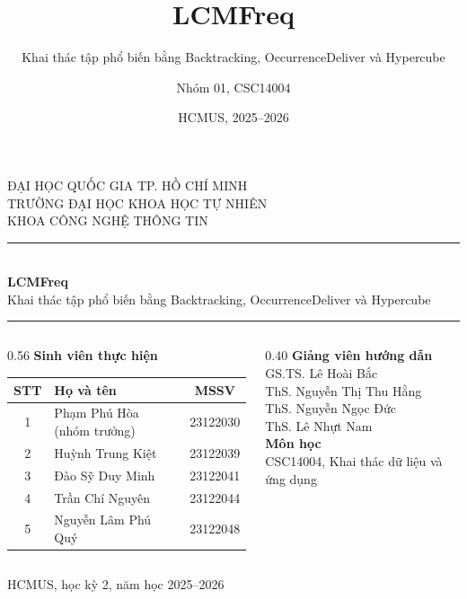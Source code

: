 \documentclass[9pt, aspectratio=169]{beamer}
\title{LCMFreq}
\subtitle{Khai thác tập phổ biến bằng Backtracking, OccurrenceDeliver và Hypercube}
\author{Nhóm 01, CSC14004}
\date{HCMUS, 2025--2026}
\begin{document}
\begin{frame}[plain]
  \begin{center}
    {\small ĐẠI HỌC QUỐC GIA TP. HỒ CHÍ MINH}\\
    {\small TRƯỜNG ĐẠI HỌC KHOA HỌC TỰ NHIÊN}\\
    {\small KHOA CÔNG NGHỆ THÔNG TIN}\\[0.35cm]
    {\color{psdearblue}\rule{0.62\linewidth}{0.6pt}}\\[0.3cm]
    {\Large\bfseries\color{psdearnavy} LCMFreq}\\[0.18cm]
    {\large Khai thác tập phổ biến bằng Backtracking, OccurrenceDeliver và Hypercube}\\[0.3cm]
    {\color{psdearblue}\rule{0.62\linewidth}{0.6pt}}
  \end{center}

  \vspace{0.35cm}
  \begin{columns}[T,onlytextwidth]
    \begin{column}{0.56\textwidth}
      \small
      \textbf{Sinh viên thực hiện}
      \vspace{0.1cm}

      \begin{tabular}{@{}c l c@{}}
        \toprule
        STT & Họ và tên & MSSV \\
        \midrule
        1 & Phạm Phú Hòa (nhóm trưởng) & 23122030 \\
        2 & Huỳnh Trung Kiệt & 23122039 \\
        3 & Đào Sỹ Duy Minh & 23122041 \\
        4 & Trần Chí Nguyên & 23122044 \\
        5 & Nguyễn Lâm Phú Quý & 23122048 \\
        \bottomrule
      \end{tabular}
    \end{column}
    \begin{column}{0.40\textwidth}
      \small
      \textbf{Giảng viên hướng dẫn}\\[0.1cm]
      GS.TS. Lê Hoài Bắc\\
      ThS. Nguyễn Thị Thu Hằng\\
      ThS. Nguyễn Ngọc Đức\\
      ThS. Lê Nhựt Nam\\[0.3cm]
      \textbf{Môn học}\\
      CSC14004, Khai thác dữ liệu và ứng dụng
    \end{column}
  \end{columns}

  \vfill
  {\scriptsize\color{psdeargray}HCMUS, học kỳ 2, năm học 2025--2026}
\end{frame}
\end{document}
